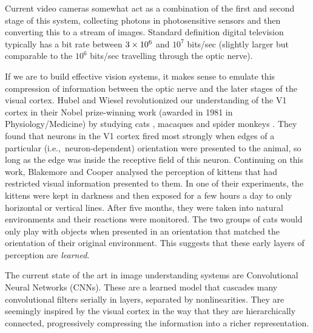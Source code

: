 Current video cameras somewhat act as a combination of the first and second
stage of this system, collecting photons in photosensitive sensors and then
converting this to a stream of images. Standard definition digital television
typically has
a bit rate between $3\times 10^6$ and $10^7$ bits/sec (slightly larger but comparable
to the $10^6$ bits/sec travelling through the optic nerve).

If we are to build effective vision systems, it makes sense to emulate this
compression of information between the optic nerve and the later stages of the visual
cortex.
Hubel and Wiesel revolutionized our understanding of the V1 cortex in their Nobel prize-winning work
(awarded in 1981 in Physiology/Medicine) by
studying cats \cite{hubel_receptive_1959, hubel_receptive_1962}, macaques and spider
monkeys \cite{hubel_receptive_1968}. They found that neurons in the V1 cortex fired
most strongly when edges of a particular (i.e.,\ neuron-dependent) orientation
were presented to the animal, so long as the edge was inside the receptive field of
this neuron.
Continuing on this work, Blakemore and Cooper \cite{blakemore_development_1970}
analysed the perception of kittens that had restricted visual information
presented to them.
In one of their experiments, the kittens were kept in darkness
and then exposed for a few hours a day to only horizontal or vertical lines.
After five months, they were taken into natural environments and their reactions
were monitored. The two groups of cats would only play with objects when
presented in an orientation that matched the orientation of their original
environment. This suggests that these early layers of perception are
\emph{learned}.

The current state of the art in image understanding systems are
Convolutional Neural Networks (CNNs). These are a learned model that
cascades many convolutional filters serially in layers, separated by
nonlinearities.
They are seemingly inspired by the visual cortex in the way that they are
hierarchically connected, progressively compressing the information into a
richer representation.

